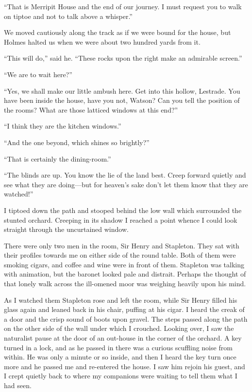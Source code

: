 \documentclass[paper=5.5in:8.5in,BCOR=7mm,twoside,DIV=calc,12pt,usegeometry,openany,chapterprefix,endperiod,headings=big]{scrbook} %
\begin{document}
\enquote{That is Merripit House and the end of our journey. I must request you to walk on tiptoe and not to talk above a whisper.}

We moved cautiously along the track as if we were bound for the house, but Holmes halted us when we were about two hundred yards from it.

\enquote{This will do,} said he. \enquote{These rocks upon the right make an admirable screen.}

\enquote{We are to wait here?}

\enquote{Yes, we shall make our little ambush here. Get into this hollow, Lestrade. You have been inside the house, have you not, Watson? Can you tell the position of the rooms? What are those latticed windows at this end?}

\enquote{I think they are the kitchen windows.}

\enquote{And the one beyond, which shines so brightly?}

\enquote{That is certainly the dining-room.}

\enquote{The blinds are up. You know the lie of the land best. Creep forward quietly and see what they are doing---but for heaven's sake don't let them know that they are watched!}

I tiptoed down the path and stooped behind the low wall which surrounded the stunted orchard. Creeping in its shadow I reached a point whence I could look straight through the uncurtained window.

There were only two men in the room, Sir Henry and Stapleton. They sat with their profiles towards me on either side of the round table. Both of them were smoking cigars, and coffee and wine were in front of them. Stapleton was talking with animation, but the baronet looked pale and distrait. Perhaps the thought of that lonely walk across the ill-omened moor was weighing heavily upon his mind.


As I watched them Stapleton rose and left the room, while Sir Henry filled his glass again and leaned back in his chair, puffing at his cigar. I heard the creak of a door and the crisp sound of boots upon gravel. The steps passed along the path on the other side of the wall under which I crouched. Looking over, I saw the naturalist pause at the door of an out-house in the corner of the orchard. A key turned in a lock, and as he passed in there was a curious scuffling noise from within. He was only a minute or so inside, and then I heard the key turn once more and he passed me and re-entered the house. I saw him rejoin his guest, and I crept quietly back to where my companions were waiting to tell them what I had seen.
\end{document}
